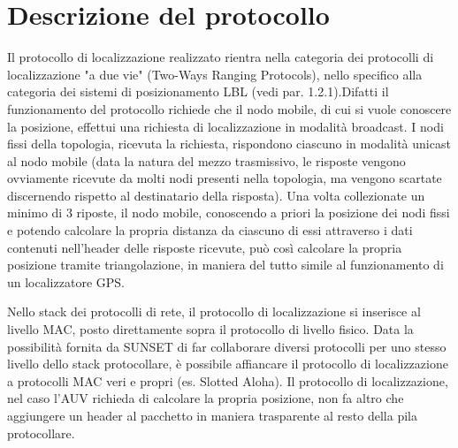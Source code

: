\documentclass[Lau,binding=0.6cm]{sapthesis}
\begin{document}
\section{Descrizione del protocollo}
Il protocollo di localizzazione realizzato rientra nella categoria dei protocolli di localizzazione "a due vie" (Two-Ways Ranging Protocols), nello specifico alla categoria dei sistemi di posizionamento LBL (vedi par. 1.2.1).\newline Difatti il funzionamento del protocollo richiede che il nodo mobile, di cui si vuole conoscere la posizione, effettui una richiesta di localizzazione in modalità broadcast. I nodi fissi della topologia, ricevuta la richiesta, rispondono ciascuno in modalità unicast al nodo mobile (data la natura del mezzo trasmissivo, le risposte vengono ovviamente ricevute da molti nodi presenti nella topologia, ma vengono scartate discernendo rispetto al destinatario della risposta).  Una volta collezionate un minimo di 3 riposte, il nodo mobile, conoscendo a priori la posizione dei nodi fissi e potendo calcolare la propria distanza da ciascuno di essi attraverso i dati contenuti nell'header delle risposte ricevute, può così calcolare la propria posizione tramite triangolazione, in maniera del tutto simile al funzionamento di un localizzatore GPS.

Nello stack dei protocolli di rete, il protocollo di localizzazione si inserisce al livello MAC, posto direttamente sopra il protocollo di livello fisico. Data la possibilità fornita da SUNSET di far collaborare diversi protocolli per uno stesso livello dello stack protocollare, è possibile affiancare il protocollo di localizzazione a protocolli MAC veri e propri (es. Slotted Aloha). Il protocollo di localizzazione, nel caso l'AUV richieda di calcolare la propria posizione, non fa altro che aggiungere un header al pacchetto in maniera trasparente al resto della pila protocollare.
\end{document}
